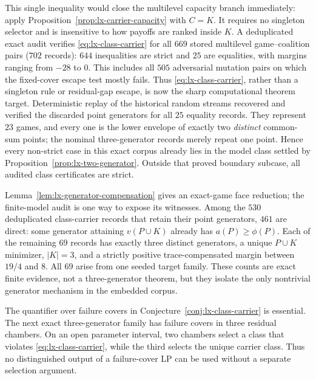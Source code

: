 This single inequality would close the multilevel capacity branch immediately:
apply Proposition~\ref{prop:lx-carrier-capacity} with $C=K$.  It requires no
singleton selector and is insensitive to how payoffs are ranked inside $K$.
A deduplicated exact audit verifies \eqref{eq:lx-class-carrier} for all $669$
stored multilevel game--coalition pairs ($702$ records): $644$ inequalities
are strict and $25$ are equalities, with margins ranging from $-28$ to $0$.
This includes all $505$ adversarial mutation pairs on which the fixed-cover
escape test mostly fails.  Thus \eqref{eq:lx-class-carrier}, rather than a
singleton rule or residual-gap escape, is now the sharp computational theorem
target.  Deterministic replay of the historical random streams recovered and
verified the discarded point generators for all $25$ equality records.  They
represent $23$ games, and every one is the lower envelope of exactly two
\emph{distinct} common-sum points; the nominal three-generator records merely
repeat one point.  Hence every non-strict case in this exact corpus already
lies in the model class settled by Proposition~\ref{prop:lx-two-generator}.
Outside that proved boundary subcase, all audited class certificates are
strict.

Lemma~\ref{lem:lx-generator-compensation} gives an exact-game face reduction;
the finite-model audit is one way to expose its witnesses.  Among the $530$
deduplicated class-carrier records that retain their point generators, $461$
are direct: some generator attaining
$v(P\cup K)$ already has $a(P)\geq\phi(P)$.  Each of the remaining $69$
records has exactly three distinct generators, a unique $P\cup K$ minimizer,
$|K|=3$, and a strictly positive trace-compensated margin between $19/4$ and
$8$.  All $69$ arise from one seeded target family.  These counts are exact
finite evidence, not a three-generator theorem, but they isolate the only
nontrivial generator mechanism in the embedded corpus.

The quantifier over failure covers in Conjecture~\ref{conj:lx-class-carrier}
is essential.  The next exact three-generator family has failure covers in
three residual chambers.  On an open parameter interval, two chambers select
a class that violates \eqref{eq:lx-class-carrier}, while the third selects the
unique carrier class.  Thus no distinguished output of a failure-cover LP can
be used without a separate selection argument.

